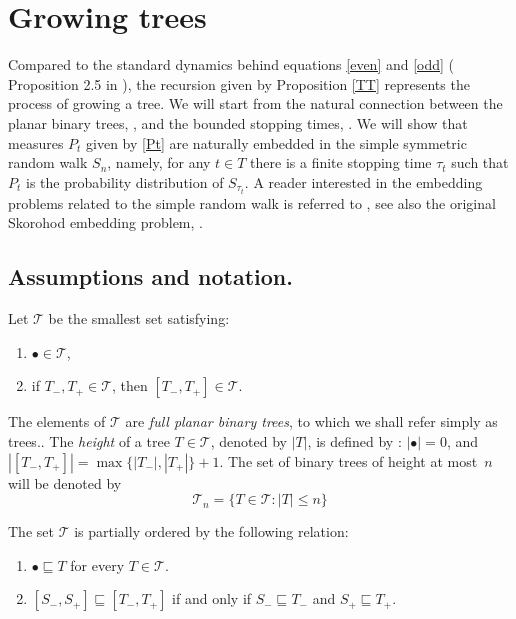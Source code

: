\documentclass[10pt]{amsart}
\theoremstyle{definition}
\newtheorem{definition}[theorem]{Definition}
\numberwithin{equation}{section}
\newcommand{\TT}{\mathcal{T}}
\begin{document}
\section{Growing trees}\label{trees}

Compared to the standard dynamics behind equations \eqref{even} and \eqref{odd}  ( Proposition 2.5 in \cite{Emme}), the recursion given by Proposition \ref{TT} represents the process of growing a tree. We will start from the natural connection between the planar binary trees, \cite{Stanley}, and the bounded stopping times, \cite{Doob}. We will show that measures $P_{t}$ given by \eqref{Pt} are naturally embedded in the simple symmetric random walk $S_n$, namely, for any $t\in T$ there is a finite stopping time $\tau_t$ such that $P_t$ is the probability distribution of $S_{\tau_t}$.  A reader interested in the embedding problems related to the simple random walk is referred to \cite{Cox}, see also the original Skorohod embedding problem, \cite{Skorohod}.
\subsection{Assumptions and notation.}
 Let $\TT$ be the smallest set satisfying:
\begin{enumerate}
\item[\textup{(i)}] $\bullet \in \TT$,
\item[\textup{(ii)}] if $T_-, T_+ \in \TT$, then $[T_-, T_+] \in \TT$. 
\end{enumerate}

The elements of $\TT$ are \emph{full planar binary trees},  to which we shall refer simply as trees.. The \emph{height} of a tree $T \in \TT$, denoted by $|T|$, is defined
by : $|\bullet| = 0$, and  $|[T_-, T_+]| = \max\{|T_-|, |T_+|\} +1.$
The set of binary trees of height at most~$n$ will be denoted by
\[
  \TT_n = \{ T \in \TT : |T| \leq n \}
\]

The  set $\TT$ is partially ordered by the following relation:  

\begin{enumerate}
\item[\textup{(i)}] $\bullet \sqsubseteq T$ for every
  $T \in \TT$.
\item[\textup{(ii)}] $[S_-, S_+] \sqsubseteq [T_-, T_+]$ if and
  only if $S_- \sqsubseteq T_-$ and $S_+ \sqsubseteq T_+$.
\end{enumerate}
\end{document}
